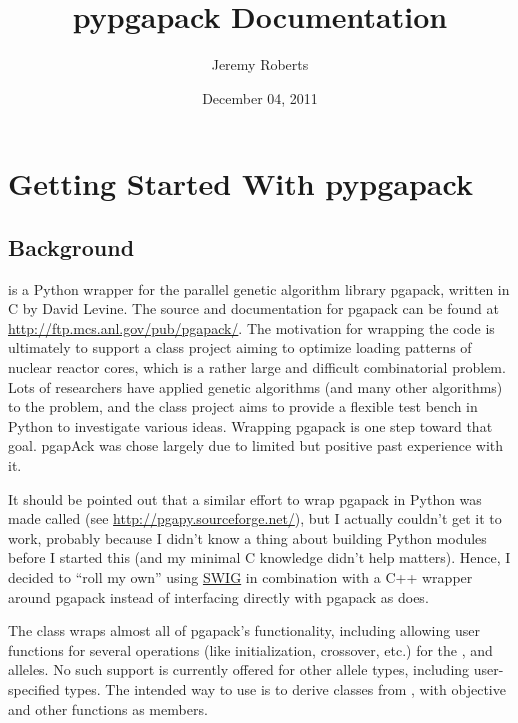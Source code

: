 \documentclass[letterpaper,11pt,english]{sphinxmanual}
\title{pypgapack Documentation}
\date{December 04, 2011}
\author{Jeremy Roberts}
\begin{document}
\maketitle
\tableofcontents
{}\label{index::doc}



\chapter{Getting Started With pypgapack}
\label{getting_started::doc}\label{getting_started:getting-started-with-pypgapack}\label{getting_started:pypgapack-a-light-python-wrapper-for-pgapack}\label{getting_started:sec-getting-started}

\section{Background}
\label{getting_started:background}
 is a Python wrapper for the parallel genetic
algorithm library pgapack, written in C by David Levine.
The source and documentation for pgapack can be found at
\href{http://ftp.mcs.anl.gov/pub/pgapack/}{http://ftp.mcs.anl.gov/pub/pgapack/}.
The motivation for wrapping the code is ultimately to support
a class project aiming to optimize loading patterns of
nuclear reactor cores, which is a rather large and difficult
combinatorial problem.  Lots of researchers have applied genetic algorithms
(and many other algorithms) to the problem, and the class project
aims to provide a flexible test bench in Python to investigate
various ideas.  Wrapping pgapack is one step toward that goal.
pgapAck was chose largely due to limited but positive past
experience with it.

It should be pointed out that a similar effort to wrap pgapack
in Python was made called  (see \href{http://pgapy.sourceforge.net/}{http://pgapy.sourceforge.net/}), but I actually couldn't get it
to work, probably because I didn't know a thing about building
Python modules before I started this (and my minimal C knowledge
didn't help matters).  Hence, I decided to ``roll my own'' using
\href{http://www.swig.org/}{SWIG} in combination with a C++ wrapper
around pgapack instead of interfacing directly with pgapack
as  does.

The {\hyperref[api_reference:PGA]{}} class wraps almost all of pgapack's functionality,
including allowing user functions for several operations (like
initialization, crossover, etc.) for the ,
 and  alleles.
No such support is currently offered for other allele types,
including user-specified types.  The intended way to use
 is to derive classes from {\hyperref[api_reference:PGA]{}}, with
objective and other functions as members.
\end{document}
